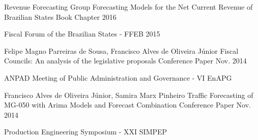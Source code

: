 \begin{cventries}

  \cventry
    {Revenue Forecasting Group}
    {Forecasting Models for the Net Current Revenue of Brazilian States}
    {Book Chapter}
    {2016}
    {
      \begin{cvitems}
        \item {Fiscal Forum of the Brazilian States - FFEB 2015}
      \end{cvitems}
    }

  \cventry
    {Felipe Magno Parreiras de Sousa, Francisco Alves de Oliveira Júnior} 
    {Fiscal Councils: An analysis of the legislative proposals}
    {Conference Paper}
    {Nov. 2014}
    {
      \begin{cvitems}
        \item {ANPAD Meeting of Public Administration and Governance - VI EnAPG}
      \end{cvitems}
    }


  \cventry
    {Francisco Alves de Oliveira Júnior, Samira Marx Pinheiro}
    {Traffic Forecasting of MG-050 with Arima Models and Forecast Combination}
    {Conference Paper}
    {Nov. 2014}
    {
      \begin{cvitems}
        \item {Production Engineering Symposium - XXI SIMPEP}
      \end{cvitems}
    }


\end{cventries}